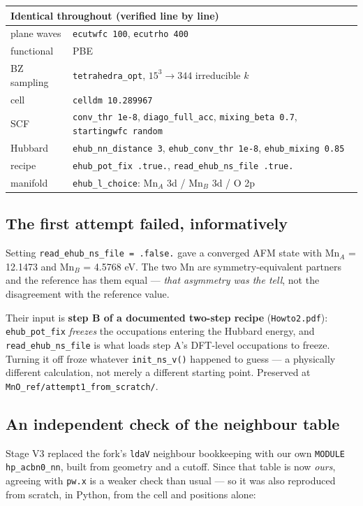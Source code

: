 \documentclass[11pt,a4paper]{article}
\newcommand{\C}[1]{\texttt{\small #1}}
\begin{document}
\begin{center}\small
\begin{tabularx}{0.95\textwidth}{lX}
\toprule
\multicolumn{2}{l}{\textbf{Identical throughout} (verified line by line)}\\
\midrule
plane waves & \C{ecutwfc 100}, \C{ecutrho 400} \\
functional  & PBE \\
BZ sampling & \C{tetrahedra_opt}, $15^3 \to 344$ irreducible $k$ \\
cell        & \C{celldm 10.289967} \\
SCF         & \C{conv_thr 1e-8}, \C{diago_full_acc}, \C{mixing_beta 0.7}, \C{startingwfc random} \\
Hubbard     & \C{ehub_nn_distance 3}, \C{ehub_conv_thr 1e-8}, \C{ehub_mixing 0.85} \\
recipe      & \C{ehub_pot_fix .true.}, \C{read_ehub_ns_file .true.} \\
manifold    & \C{ehub_l_choice}: Mn$_A$ 3d / Mn$_B$ 3d / O 2p \\
\bottomrule
\end{tabularx}
\end{center}

\subsection{The first attempt failed, informatively}

Setting \C{read_ehub_ns_file = .false.} gave a converged AFM state with
Mn$_A$ = 12.1473 and Mn$_B$ = 4.5768 eV. The two Mn are symmetry-equivalent
partners and the reference has them equal --- \emph{that asymmetry was the
tell}, not the disagreement with the reference value.

Their input is \textbf{step B of a documented two-step recipe} (\C{Howto2.pdf}):
\C{ehub_pot_fix} \emph{freezes} the occupations entering the Hubbard energy, and
\C{read_ehub_ns_file} is what loads step A's DFT-level occupations to freeze.
Turning it off froze whatever \C{init_ns_v()} happened to guess --- a physically
different calculation, not merely a different starting point. Preserved at
\C{MnO_ref/attempt1_from_scratch/}.

\subsection{An independent check of the neighbour table}

Stage V3 replaced the fork's \C{ldaV} neighbour bookkeeping with our own
\C{MODULE hp_acbn0_nn}, built from geometry and a cutoff. Since that table is
now \emph{ours}, agreeing with \C{pw.x} is a weaker check than usual --- so it
was also reproduced from scratch, in Python, from the cell and positions alone:
\end{document}
